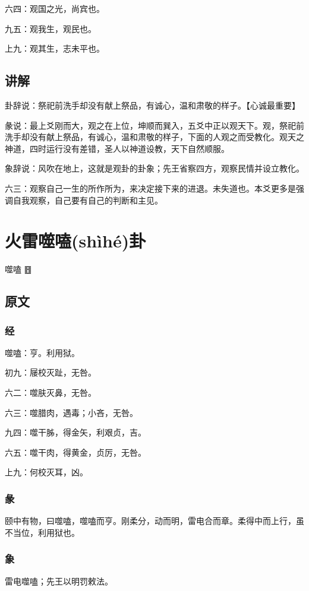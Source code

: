 \documentclass[12pt,oneside]{book}
\begin{document}
六四：观国之光，尚宾也。

九五：观我生，观民也。

上九：观其生，志未平也。

\section{讲解}
卦辞说：祭祀前洗手却没有献上祭品，有诚心，温和肃敬的样子。【心诚最重要】

彖说：最上爻刚而大，观之在上位，坤顺而巽入，五爻中正以观天下。观，祭祀前洗手却没有献上祭品，有诚心，温和肃敬的样子，下面的人观之而受教化。观天之神道，四时运行没有差错，圣人以神道设教，天下自然顺服。

象辞说：风吹在地上，这就是观卦的卦象；先王省察四方，观察民情并设立教化。

六三：观察自己一生的所作所为，来决定接下来的进退。未失道也。本爻更多是强调自我观察，自己要有自己的判断和主见。

\chapter{火雷噬嗑(shìhé)卦}
噬嗑 {\Large ䷔}

\section{原文}

\subsection{经}
噬嗑：亨。利用狱。

初九：屦校灭趾，无咎。

六二：噬肤灭鼻，无咎。

六三：噬腊肉，遇毒；小吝，无咎。

九四：噬干胏，得金矢，利艰贞，吉。

六五：噬干肉，得黄金，贞厉，无咎。

上九：何校灭耳，凶。

\subsection{彖}
颐中有物，曰噬嗑，噬嗑而亨。刚柔分，动而明，雷电合而章。柔得中而上行，虽不当位，利用狱也。

\subsection{象}
雷电噬嗑；先王以明罚敕法。
\end{document}
